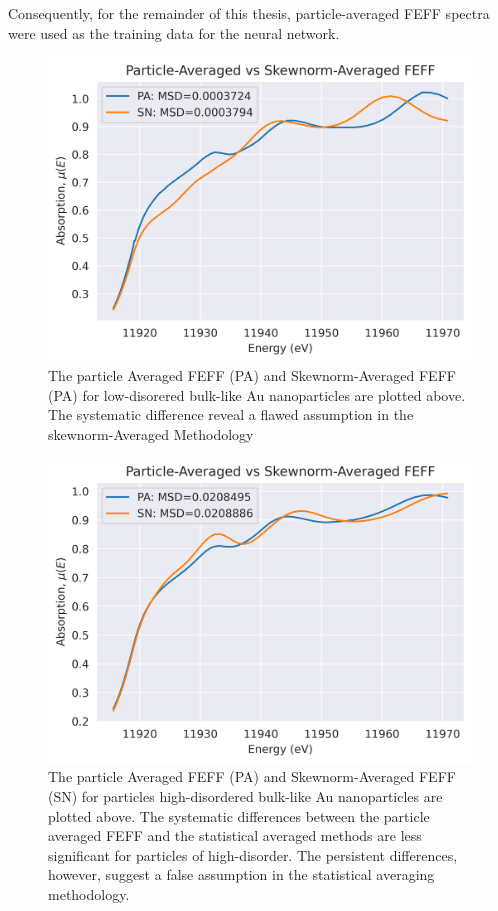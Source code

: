 Consequently, for the remainder of this thesis, particle-averaged FEFF spectra were used as the training data for the neural network.

\begin{figure}[!h]
	\centering
	
	\includegraphics[width=.75\linewidth]{Chapters/Figures/PA-vs-skewnorm-newvals.png}
	\caption[Particle-Averaged vs. Skewnorm-Averaged FEFF Low-Disorder]{The particle Averaged FEFF (PA) and Skewnorm-Averaged FEFF (PA) for low-disorered bulk-like Au nanoparticles are plotted above. The systematic difference reveal a flawed assumption in the skewnorm-Averaged Methodology}
	\label{fig:pa-vs-sknm-feff}
\end{figure}

\begin{figure}[!h]
	\centering
	
	\includegraphics[width=.75\linewidth]{Chapters/Figures/PA-vs-skewnorm-newvals-large-msd.png}
	\caption[Particle-Averaged vs. Skewnorm-Averaged FEFF High-Disorder]{The particle Averaged FEFF (PA) and Skewnorm-Averaged FEFF (SN) for particles high-disordered bulk-like Au nanoparticles are plotted above. The systematic differences between the particle averaged FEFF and the statistical averaged methods are less significant for particles of high-disorder. The persistent differences, however, suggest a false assumption in the statistical averaging methodology.}
	\label{fig:pa-vs-sknm-feff-bigmsd}
\end{figure}


